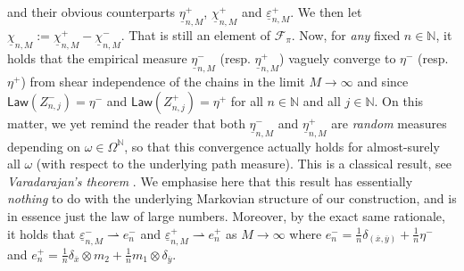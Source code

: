 \documentclass[leqno, 11pt, a4paper]{amsart}
\theoremstyle{definition}
\newcommand{\N}{\mathbb{N}}
\newcommand{\cF}{\mathcal{F}}
\newcommand{\eps}{\varepsilon}
\newcommand{\ox}{\overline{x}}
\newcommand{\oy}{\overline{y}}
\newcommand{\law}{\textsf{Law}}
\newcommand{\wto}{\rightharpoonup}
\begin{document}
and their obvious counterparts $\underline{\eta}^+_{n, M}$, $\underline{\chi}^+_{n,M} $ and $\underline{\eps}^+_{n, M}$. We then let $\underline{\chi}_{n, M} := \underline{\chi}^+_{n,M}  - \underline{\chi}^-_{n,M}$. That is still an element of $\cF_\pi$. Now, for \textit{any} fixed $n \in \N$, it holds that the empirical measure $\underline{\eta}^-_{n, M}$ (resp. $\underline{\eta}^+_{n, M}$) vaguely converge to $\eta^-$ (resp. $\eta^+$) from shear independence of the chains in the limit $M \to \infty$ and since $\law(Z_{n,j}^-) = \eta^-$ and $\law(Z_{n,j}^+) = \eta^+$ for all $n \in \N$ and all $j \in \N$. On this matter, we yet remind the reader that both $\underline{\eta}^-_{n, M}$ and $\underline{\eta}^+_{n, M}$ are \textit{random} measures depending on $\omega \in \Omega^\N$, so that this convergence actually holds for almost-surely all $\omega$ (with respect to the underlying path measure). This is a classical result, see \textit{Varadarajan's theorem} \cite[Thm. 11.4.1]{dudleyRealAnalysisProbability2002}. We emphasise here that this result has essentially \textit{nothing} to do with the underlying Markovian structure of our construction, and is in essence just the law of large numbers.  Moreover, by the exact same rationale, it holds that $\underline{\eps}^-_{n, M}\wto e^-_n$ and $\underline{\eps}^+_{n, M}\wto e^+_n$ as $M \to \infty$ where $e_n^- = \frac1n \delta_{(\ox, \oy)} + \frac1n \eta^-$ and $e_n^+ = \frac1n \delta_{\overline{x}} \otimes m_2 + \frac1n m_1 \otimes \delta_{\overline{y}}$. 
\end{document}
